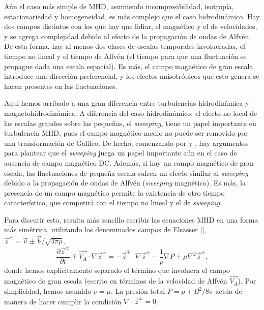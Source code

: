 Aún el caso más simple de MHD, asumiendo incompresibilidad, isotropía,
estacionariedad y homogeneidad, es más complejo que el caso
hidrodinámico. Hay dos campos distintos con los que hay que lidiar, el
magnético y el de velocidades, y se agrega complejidad debido al
efecto de la propagación de ondas de Alfv\'en. De esta forma, hay al
menos dos clases de escalas temporales involucradas, el tiempo no
lineal y el tiempo de Alfv\'en (el tiempo para que una fluctuación se
propague dada una escala espacial). Es más, el campo magnético de gran
escala introduce una dirección preferencial, y los efectos
anisotrópicos que esto genera se hacen presentes en las fluctuaciones.

Aquí hemos arribado a una gran diferencia entre turbulencias
hidrodinámica y magnetohidrodinámica. A diferencia del caso
hidrodinámico, el efecto no local de las escalas grandes sobre las
pequeñas, el \textit{sweeping}, tiene un papel importante en
turbulencia MHD, pues el campo magnético medio no puede ser
removido por una transformación de Galileo. De hecho, comenzando por
\cite{iroshnikov_turbulence_1964} y
\cite{kraichnan_inertial-range_1965}, hay argumentos para plantear que
el \textit{sweeping} juega un papel importante aún en el caso de
ausencia de campo magnético DC. Además, si hay un campo magnético de
gran escala, las fluctuaciones de pequeña escala sufren un efecto
similar al \textit{sweeping} debido a la propagación de ondas de
Alfv\'en (\textit{sweeping} magnético). Es más, la presencia de un
campo magnético permite la existencia de otro tiempo característico,
que competirá con el tiempo no lineal y el de \textit{sweeping}.

Para discutir esto, resulta más sencillo escribir las ecuaciones MHD
en una forma más simétrica, utilizando los denominados campos de
Els\"asser [\cite{elsasser_hydromagnetism_1956}], $\vec{z}^\pm =
\vec{v} \pm \vec{b}/\sqrt{4\pi\rho}$,
\begin{equation}\label{eq2:MHDElsasser}
  \frac{\partial \vec{z}^\pm}{\partial t} \mp \vec{V_A} \cdot \nabla\vec{z}^\pm = -\vec{z}^\mp \cdot \nabla\vec{z}^\pm - \frac{1}{\rho} \nabla P + \mu \nabla^2 \vec{z}^\pm,
\end{equation}
donde hemos explícitamente separado el término que involucra el campo
magnético de gran escala (escrito en términos de la velocidad de
Alfv\'en $\vec{V_A}$). Por simplicidad, hemos asumido $\nu = \mu$. La
presión total $P = p + B^2/8\pi$ actúa de manera de hacer cumplir la
condición $\nabla\cdot\vec{z}^\pm = 0$.

